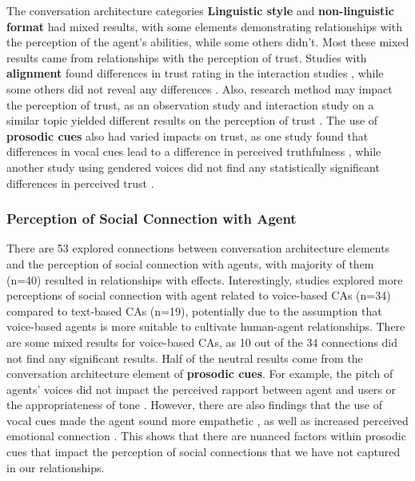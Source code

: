 \documentclass[sigconf,screen,review, anonymous]{acmart}
\newcommand{\cmt}[1]{}%
\begin{document}
The conversation architecture categories \textbf{Linguistic style} and \textbf{non-linguistic format} had mixed results, with some elements demonstrating relationships with the perception of the agent's abilities, while some others didn't. Most these mixed results came from relationships with the perception of trust. Studies with \textbf{alignment} found differences in trust rating in the interaction studies \cite{hoegen2019end}\cmt{[31]}, while some others did not reveal any differences \cite{huiyang2022improving}\cmt{[17]}. Also, research method may impact the perception of trust, as an observation study and interaction study on a similar topic yielded different results on the perception of trust \cite{linnemann2018can}\cmt{[15]}. The use of \textbf{prosodic cues} also had varied impacts on trust, as one study found that differences in vocal cues lead to a difference in perceived truthfulness \cite{dubiel2020persuasive}\cmt{[60]}, while another study using gendered voices did not find any statistically significant differences in perceived trust \cite{jestin2022effects}\cmt{[81]}.

\subsubsection{Perception of Social Connection with Agent}

There are 53 explored connections between conversation architecture elements and the perception of social connection with agents, with majority of them (n=40) resulted in relationships with effects. Interestingly, studies explored more perceptions of social connection with agent related to voice-based CAs (n=34) compared to text-based CAs (n=19), potentially due to the assumption that voice-based agents is more suitable to cultivate human-agent relationships. There are some mixed results for voice-based CAs, as 10 out of the 34 connections did not find any significant results. Half of the neutral results come from the conversation architecture element of \textbf{prosodic cues}. For example, the pitch of agents' voices did not impact the perceived rapport \cite{lubold2016effects}\cmt{[86]} between agent and users or the appropriateness of tone \cite{jestin2022effects}\cmt{[81]}. However, there are also findings that the use of vocal cues made the agent sound more empathetic \cite{tolmeijer2021female}\cmt{[62]}, as well as increased perceived emotional connection \cite{chan2021kinvoices}\cmt{[74]}\cite{kim2020can}\cmt{[24]}. This shows that there are nuanced factors within prosodic cues that impact the perception of social connections that we have not captured in our relationships.
\end{document}

